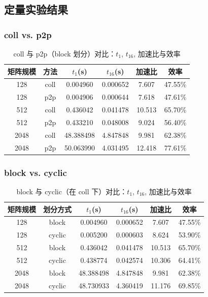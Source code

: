 \documentclass{SYSUReport}
\begin{document}
\subsection{定量实验结果}

\subsubsection{coll vs. p2p}
\begin{table}[H]
\centering
\caption{coll 与 p2p（block 划分）对比：$t_1$, $t_{16}$, 加速比与效率}
\label{tab:coll_p2p}
\begin{tabular}{|c|c|c|c|c|c|}
\hline
矩阵规模 & 方法 & $t_1$(s) & $t_{16}$(s) & 加速比 & 效率 \\
\hline
128  & coll & 0.004960  & 0.000652  & 7.607  & 47.55\% \\
128  & p2p  & 0.004906  & 0.000644  & 7.618  & 47.61\% \\
\hline
512  & coll & 0.436042  & 0.041478  & 10.513 & 65.70\% \\
512  & p2p  & 0.433210  & 0.048008  & 9.024  & 56.40\% \\
\hline
2048 & coll & 48.388498 & 4.847848  & 9.981  & 62.38\% \\
2048 & p2p  & 50.063990 & 4.031495  & 12.418 & 77.61\% \\
\hline
\end{tabular}
\end{table}

\subsubsection{block vs. cyclic}
\begin{table}[H]
\centering
\caption{block 与 cyclic（在 coll 下）对比：$t_1$, $t_{16}$, 加速比与效率}
\label{tab:block_cyclic}
\begin{tabular}{|c|c|c|c|c|c|}
\hline
矩阵规模 & 划分方式 & $t_1$(s) & $t_{16}$(s) & 加速比 & 效率 \\
\hline
128  & block  & 0.004960  & 0.000652  & 7.607  & 47.55\% \\
128  & cyclic & 0.005200  & 0.000603  & 8.624  & 53.90\% \\
\hline
512  & block  & 0.436042  & 0.041478  & 10.513 & 65.70\% \\
512  & cyclic & 0.438774  & 0.042574  & 10.306 & 64.41\% \\
\hline
2048 & block  & 48.388498 & 4.847848  & 9.981  & 62.38\% \\
2048 & cyclic & 48.730933 & 4.360419  & 11.176 & 69.85\% \\
\hline
\end{tabular}
\end{table}
\end{document}
